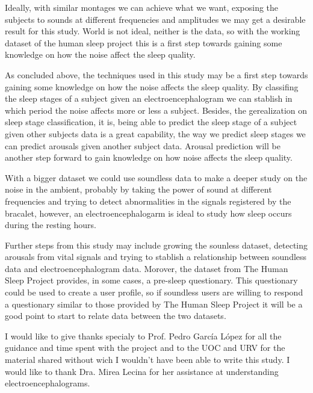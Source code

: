 Ideally, with similar montages we can achieve what we want, exposing the subjects to sounds at different frequencies and amplitudes we may get a desirable result for this study. World is not ideal, neither is the data, so with the working dataset of the human sleep project this is a first step towards gaining some knowledge on how the noise affect the sleep quality.

As concluded above, the techniques used in this study may be a first step towards gaining some knowledge on how the noise affects the sleep quality. By classifing the sleep stages of a subject given an electroencephalogram we can stablish in which period the noise affects more or less a subject. Besides, the gerealization on sleep stage classification, it is, being able to predict the sleep stage of a subject given other subjects data is a great capability, the way we predict sleep stages we can predict arousals given another subject data. Arousal prediction will be another step forward to gain knowledge on how noise affects the sleep quality. 

With a bigger dataset we could use soundless data to make a deeper study on the noise in the ambient, probably by taking the power of sound at different frequencies and trying to detect abnormalities in the signals registered by the bracalet, however, an electroencephalogarm is ideal to study how sleep occurs during the resting hours. 

Further steps from this study may include growing the sounless dataset, detecting arousals from vital signals and trying to stablish a relationship between soundless data and electroencephalogram data. Morover, the dataset from The Human Sleep Project provides, in some cases, a pre-sleep questionary. This questionary could be used to create a user profile, so if soundless users are willing to respond a questionary similar to those provided by The Human Sleep Project it will be a good point to start to relate data between the two datasets.  

I would like to give thanks specialy to Prof. Pedro Garc\'ia L\'opez for all the guidance and time spent with the project and to the UOC and URV for the material shared without wich I wouldn't have been able to write this study. I would like to thank Dra. Mirea Lecina for her assistance at understanding electroencephalograms.


